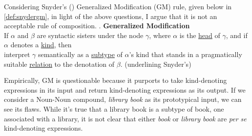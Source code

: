 \documentclass[MilwayThesis]{subfiles}
\begin{document}
Considering Snyder's (\citeyear{snyder2012parameter}) Generalized Modification (GM) rule, given below in \ref{def:snydergm}, in light of the above questions, I argue that it is not an acceptable rule of composition.
\ex. \textbf{Generalized Modification} \parencite{snyder2012parameter}\\
If $\alpha$ and $\beta$ are syntactic sisters under the node $\gamma$, where $\alpha$ is the \uline{head} of $\gamma$, and if $\alpha$ denotes a \uline{kind}, then\\
interpret $\gamma$ semantically as a \uline{subtype} of $\alpha$'s kind that stands in a pragmatically suitable \uline{relation} to the denotation of $\beta$. (underlining Snyder's)

Empirically, GM is questionable because it purports to take kind-denoting expressions in its input and return kind-denoting expressions as its output.
If we consider a Noun-Noun compound, \textit{library book} as its prototypical input, we can see its flaws.
While it's true that a library book is a subtype of book, one associated with a library, it is not clear that either \textit{book} or \textit{library book} are \textit{per se} kind-denoting expressions.
\end{document}
